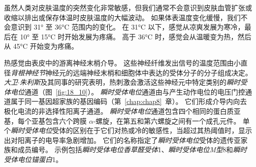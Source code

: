 虽然人类对皮肤温度的突然变化非常敏感，但我们通常不会意识到皮肤血管扩张或收缩以排出或保存体温时皮肤温度的大幅波动。
如果体表温度变化缓慢，我们不会意识到 31° 至 36°C 范围内的变化。
在 31°C 以下，感觉从凉爽发展为寒冷，最后在 10° 至 15°C 时开始发展为疼痛。
高于 36°C 时，感觉会从温暖变为热，然后从 45°C 开始变为疼痛。


热感觉由表皮中的游离神经末梢介导。
这些神经纤维发出信号的温度范围由小直径\textit{背根神经节}神经元的远端神经末梢和细胞体中表达的受体分子的分子组成决定。
\textit{大卫$\cdot$朱利斯}及其同事的研究表明，热刺激会激活这些神经元中特定类别的\textit{瞬时受体电位}通道（图~\ref{fig:18_10}）。
\textit{瞬时受体电位}通道由与产生动作电位的电压门控通道属于同一基因超家族的基因编码（第~\ref{chap:chap8}~章）。 
它们形成介导内向去极化电流的非选择性阳离子通道。
\textit{瞬时受体电位}通道包含四个相同的蛋白质亚基，每个亚基包含六个跨膜 $\alpha$-螺旋，在第五和第六螺旋之间有一个成孔元件。
单个\textit{瞬时受体电位}受体的区别在于它们对热或冷的敏感性，当超过其热阈值时，显示出对阳离子的电导率急剧增加。
它们的名称指定了\textit{瞬时受体电位}受体的遗传亚家族和成员编号。 
示例包括\textit{瞬时受体电位香草醛受体}1、\textit{瞬时受体电位M型}8和\textit{瞬时受体电位锚蛋白}1。


